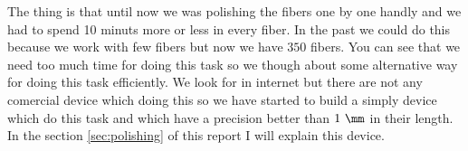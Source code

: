 The thing is that until now we was polishing the fibers one by one handly and we had to spend 10 minuts more or less in every fiber. In the past we could do this because we work with few fibers but now we have $350$ fibers. You can see that we need too much time for doing this task so we though about some alternative way for doing this task efficiently. We look for in internet but there are not any comercial device which doing this so we have started to build a simply device which do this task and which have a precision better than $1~\mm$ in their length. In the section \ref{sec:polishing} of this report I will explain this device. 
